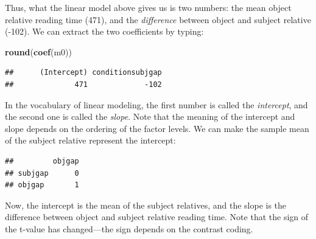 \documentclass[12pt,]{krantz}
\newenvironment{Shaded}{\begin{snugshade}}{\end{snugshade}}
\newcommand{\CommentTok}[1]{\textcolor[rgb]{0.56,0.35,0.01}{\textit{#1}}}
\newcommand{\DataTypeTok}[1]{\textcolor[rgb]{0.13,0.29,0.53}{#1}}
\newcommand{\KeywordTok}[1]{\textcolor[rgb]{0.13,0.29,0.53}{\textbf{#1}}}
\newcommand{\NormalTok}[1]{#1}
\newcommand{\OperatorTok}[1]{\textcolor[rgb]{0.81,0.36,0.00}{\textbf{#1}}}
\newcommand{\StringTok}[1]{\textcolor[rgb]{0.31,0.60,0.02}{#1}}
\begin{document}
Thus, what the linear model above gives us is two numbers: the mean object relative reading time (471), and the \emph{difference} between object and subject relative (-102). We can extract the two coefficients by typing:

\begin{Shaded}
\begin{Highlighting}[]
\KeywordTok{round}\NormalTok{(}\KeywordTok{coef}\NormalTok{(m0))}
\end{Highlighting}
\end{Shaded}

\begin{verbatim}
##      (Intercept) conditionsubjgap 
##              471             -102
\end{verbatim}

In the vocabulary of linear modeling, the first number is called the \emph{intercept}, and the second one is called the \emph{slope}.
Note that the meaning of the intercept and slope depends on the ordering of the factor levels. We can make the sample mean of the subject relative represent the intercept:

\begin{Shaded}
\end{Shaded}

\begin{verbatim}
##         objgap
## subjgap      0
## objgap       1
\end{verbatim}

Now, the intercept is the mean of the subject relatives, and the slope is the difference between object and subject relative reading time. Note that the sign of the t-value has changed---the sign depends on the contrast coding.

\begin{Shaded}
\end{Shaded}
\end{document}
